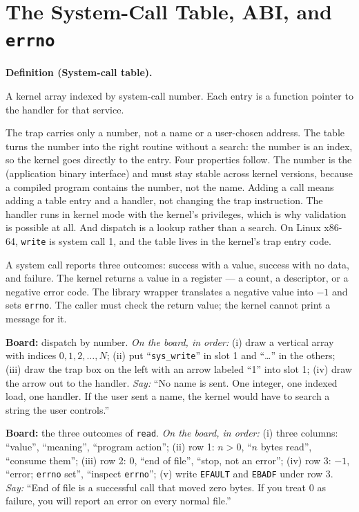 \documentclass[11pt]{article}
\newenvironment{definitionbox}[1]{%
  \par\noindent\textbf{Definition (#1).}\ \itshape
}{\par\vspace{0.3em}}
\begin{document}
\section{The System-Call Table, ABI, and \texttt{errno}}

\begin{definitionbox}{System-call table}
A kernel array indexed by system-call number. Each entry is a function pointer to the handler for that service.
\end{definitionbox}

The trap carries only a number, not a name or a user-chosen address. The table turns the number into the right routine without a search: the number is an index, so the kernel goes directly to the entry. Four properties follow. The number is the  (application binary interface) and must stay stable across kernel versions, because a compiled program contains the number, not the name. Adding a call means adding a table entry and a handler, not changing the trap instruction. The handler runs in kernel mode with the kernel's privileges, which is why validation is possible at all. And dispatch is a lookup rather than a search. On Linux x86-64, \texttt{write} is system call 1, and the table lives in the kernel's trap entry code.

A system call reports three outcomes: success with a value, success with no data, and failure. The kernel returns a value in a register --- a count, a descriptor, or a negative error code. The library wrapper translates a negative value into $-1$ and sets \texttt{errno}. The caller must check the return value; the kernel cannot print a message for it.

\textbf{Board:} dispatch by number. \emph{On the board, in order:} (i) draw a vertical array with indices $0,1,2,\dots,N$; (ii) put ``\texttt{sys\_write}'' in slot 1 and ``\dots'' in the others; (iii) draw the trap box on the left with an arrow labeled ``1'' into slot 1; (iv) draw the arrow out to the handler. \emph{Say:} ``No name is sent. One integer, one indexed load, one handler. If the user sent a name, the kernel would have to search a string the user controls.''

\textbf{Board:} the three outcomes of \texttt{read}. \emph{On the board, in order:} (i) three columns: ``value'', ``meaning'', ``program action''; (ii) row 1: $n>0$, ``$n$ bytes read'', ``consume them''; (iii) row 2: $0$, ``end of file'', ``stop, not an error''; (iv) row 3: $-1$, ``error; \texttt{errno} set'', ``inspect \texttt{errno}''; (v) write \texttt{EFAULT} and \texttt{EBADF} under row 3. \emph{Say:} ``End of file is a successful call that moved zero bytes. If you treat 0 as failure, you will report an error on every normal file.''
\end{document}
